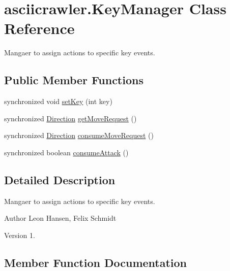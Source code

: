 \hypertarget{classasciicrawler_1_1KeyManager}{}\section{asciicrawler.\+Key\+Manager Class Reference}
\label{classasciicrawler_1_1KeyManager}


Mangaer to assign actions to specific key events.  


\subsection*{Public Member Functions}
\begin{DoxyCompactItemize}
\item 
synchronized void \hyperlink{classasciicrawler_1_1KeyManager_a891959638b2c091d79b2401587198511}{set\+Key} (int key)
\item 
synchronized \hyperlink{enumasciicrawler_1_1Direction}{Direction} \hyperlink{classasciicrawler_1_1KeyManager_a773bb4adf1be2cbb0584529f1945bb26}{get\+Move\+Request} ()
\item 
synchronized \hyperlink{enumasciicrawler_1_1Direction}{Direction} \hyperlink{classasciicrawler_1_1KeyManager_aea5d8fd872321b459ca769298476f377}{consume\+Move\+Request} ()
\item 
synchronized boolean \hyperlink{classasciicrawler_1_1KeyManager_a31c68dfad3df7fdc53e613ce90312be8}{consume\+Attack} ()
\end{DoxyCompactItemize}


\subsection{Detailed Description}
Mangaer to assign actions to specific key events. 

\begin{DoxyAuthor}{Author}
Leon Hansen, Felix Schmidt 
\end{DoxyAuthor}
\begin{DoxyVersion}{Version}
1. 
\end{DoxyVersion}


\subsection{Member Function Documentation}
\mbox{\label{classasciicrawler_1_1KeyManager_a31c68dfad3df7fdc53e613ce90312be8}} 
